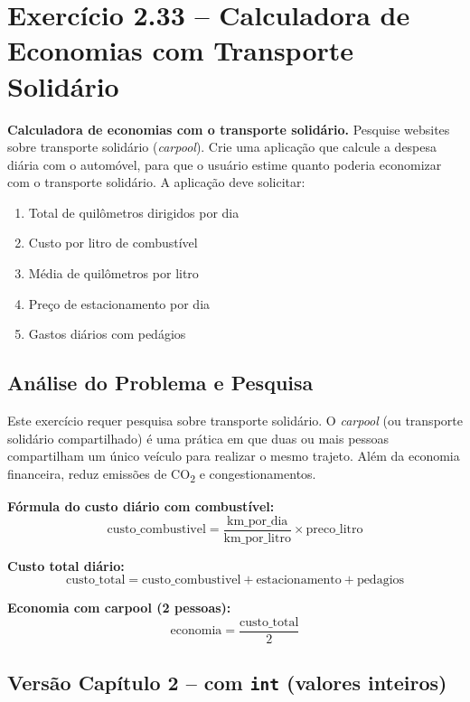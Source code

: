 \documentclass[12pt,a4paper]{article}
\begin{document}
\section{Exercício 2.33 -- Calculadora de Economias com Transporte Solidário}

\begin{enunciadoBox}[Enunciado 2.33]
\textbf{Calculadora de economias com o transporte solidário.}
Pesquise websites sobre transporte solidário (\textit{carpool}). Crie uma aplicação
que calcule a despesa diária com o automóvel, para que o usuário estime quanto
poderia economizar com o transporte solidário. A aplicação deve solicitar:
\begin{enumerate}[label=\alph*)]
  \item Total de quilômetros dirigidos por dia
  \item Custo por litro de combustível
  \item Média de quilômetros por litro
  \item Preço de estacionamento por dia
  \item Gastos diários com pedágios
\end{enumerate}
\end{enunciadoBox}

\subsection{Análise do Problema e Pesquisa}

\begin{pesquisa}
Este exercício requer pesquisa sobre transporte solidário. O \textit{carpool}
(ou transporte solidário compartilhado) é uma prática em que duas ou mais pessoas
compartilham um único veículo para realizar o mesmo trajeto. Além da economia financeira,
reduz emissões de CO\textsubscript{2} e congestionamentos.

\textbf{Fórmula do custo diário com combustível:}
\[
  \text{custo\_combustivel} = \frac{\text{km\_por\_dia}}{\text{km\_por\_litro}} \times \text{preco\_litro}
\]

\textbf{Custo total diário:}
\[
  \text{custo\_total} = \text{custo\_combustivel} + \text{estacionamento} + \text{pedagios}
\]

\textbf{Economia com carpool (2 pessoas):}
\[
  \text{economia} = \frac{\text{custo\_total}}{2}
\]
\end{pesquisa}

\subsection{Versão Capítulo 2 -- com \texttt{int} (valores inteiros)}
\end{document}
